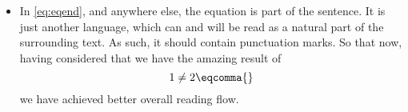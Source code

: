 \begin{itemize}
	We can \verb|\DeclareMathOperator{\examplemean}{MEAN}|, then use \verb|\text| for the subscript:
	\begin{equation}\label{eq:eqend}
		\examplemean_{\text{sample}} \neq 2 \eqend{}
	\end{equation}
	\item In \cref{eq:eqend}, and anywhere else, the equation is part of the sentence.
	It is just another language, which can and will be read as a natural part of the surrounding text.
	As such, it should contain punctuation marks.
	So that now, having considered that we have the amazing result of
	\begin{equation}
		1 \neq 2 \eqcomma{}
	\end{equation}
	we have achieved better overall reading flow.
\end{itemize}